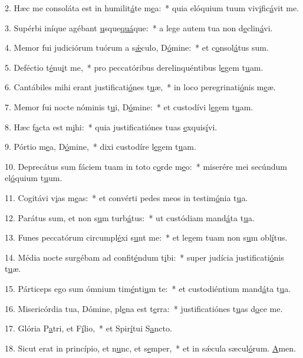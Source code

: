 2. Hæc me consoláta est in humilit\uline{á}te m\uline{e}a:~* quia elóquium tuum viv\uline{i}fic\uline{á}vit me.\par 
3. Supérbi iníque agébant \uline{u}sque\uline{quá}que:~* a lege autem tua non d\uline{e}clin\uline{á}vi.\par 
4. Memor fui judiciórum tuórum a s\uline{ǽ}culo, D\uline{ó}mine:~* et c\uline{o}nsol\uline{á}tus sum.\par 
5. Deféctio t\uline{é}nu\uline{i}t me,~* pro peccatóribus derelinquéntibus l\uline{e}gem t\uline{u}am.\par 
6. Cantábiles mihi erant justificati\uline{ó}nes t\uline{u}æ,~* in loco peregrinati\uline{ó}nis m\uline{e}æ.\par 
7. Memor fui nocte nóminis t\uline{u}i, D\uline{ó}mine:~* et custodívi l\uline{e}gem t\uline{u}am.\par 
8. Hæc f\uline{a}cta est m\uline{i}hi:~* quia justificatiónes tuas \uline{e}xquis\uline{í}vi.\par 
9. Pórtio m\uline{e}a, D\uline{ó}mine,~* dixi custodíre l\uline{e}gem t\uline{u}am.\par 
10. Deprecátus sum fáciem tuam in toto c\uline{o}rde m\uline{e}o:~* miserére mei secúndum el\uline{ó}quium t\uline{u}um.\par 
11. Cogitávi v\uline{i}as m\uline{e}as:~* et convérti pedes meos in testim\uline{ó}nia t\uline{u}a.\par 
12. Parátus sum, et non s\uline{u}m turb\uline{á}tus:~* ut custódiam mand\uline{á}ta t\uline{u}a.\par 
13. Funes peccatórum circumpl\uline{é}xi s\uline{u}nt me:~* et legem tuam non s\uline{u}m obl\uline{í}tus.\par 
14. Média nocte surgébam ad confit\uline{é}ndum t\uline{i}bi:~* super judícia justificati\uline{ó}nis t\uline{u}æ.\par 
15. Párticeps ego sum ómnium tim\uline{é}nti\uline{u}m te:~* et custodiéntium mand\uline{á}ta t\uline{u}a.\par 
16. Misericórdia tua, Dómine, pl\uline{e}na est t\uline{e}rra:~* justificatiónes t\uline{u}as d\uline{o}ce me.\par 
17. Glória P\uline{a}tri, et F\uline{í}lio,~* et Spir\uline{í}tui S\uline{a}ncto.\par 
18. Sicut erat in princípio, et n\uline{u}nc, et s\uline{e}mper,~* et in sǽcula sæcul\uline{ó}rum. \uline{A}men.\par 
